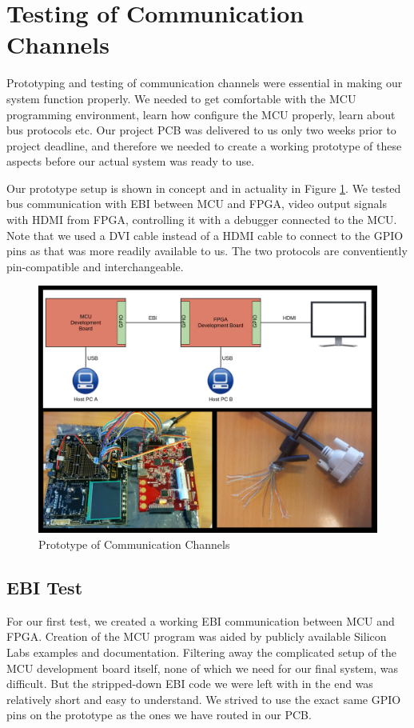 \section{Testing of Communication Channels}
Prototyping and testing of communication channels were essential in making our system function properly.
We needed to get comfortable with the MCU programming environment, learn how configure the MCU properly, learn about bus protocols etc.
Our project PCB was delivered to us only two weeks prior to project deadline, and therefore we needed to create a working prototype of these aspects before our actual system was ready to use.

Our prototype setup is shown in concept and in actuality in Figure \ref{prototype}.
We tested bus communication with EBI between MCU and FPGA, video output signals with HDMI from FPGA, controlling it with a debugger connected to the MCU.
Note that we used a DVI cable instead of a HDMI cable to connect to the GPIO pins as that was more readily available to us. The two protocols are conventiently pin-compatible and interchangeable.

\begin{figure}[htp]
\centering
\includegraphics[width=\textwidth]{diagrams/prototype_complete.png}
\caption{Prototype of Communication Channels}
\label{prototype}
\end{figure}

\subsection{EBI Test}
For our first test, we created a working EBI communication between MCU and FPGA.
Creation of the MCU program was aided by publicly available Silicon Labs examples and documentation.
Filtering away the complicated setup of the MCU development board itself, none of which we need for our final system, was difficult.
But the stripped-down EBI code we were left with in the end was relatively short and easy to understand.
We strived to use the exact same GPIO pins on the prototype as the ones we have routed in our PCB.

